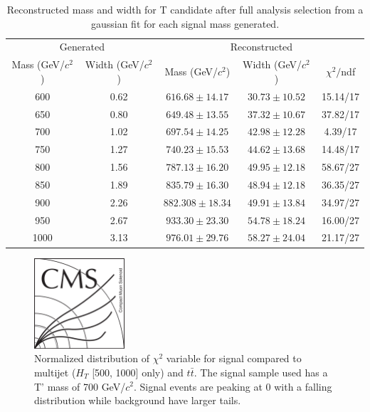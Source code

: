 \begin{table}[htbH]
\begin{center}
\begin{tabular}{|c|c|c|c|c|}
\hline 
\multicolumn{2}{|c}{Generated} & \multicolumn{3}{|c|}{Reconstructed} \\
Mass (GeV/$c^{2}$) & Width (GeV/$c^{2}$) & Mass (GeV/$c^{2}$) & Width (GeV/$c^{2}$) & $\chi^{2} /$ndf\\
\hline
600 & 0.62 &$616.68\pm14.17$ & $30.73\pm10.52$ & 15.14/17\\
650 & 0.80 &$649.48\pm13.55$ & $37.32\pm10.67$ & 37.82/17\\
700 & 1.02 &$697.54\pm14.25$ & $42.98\pm12.28$ & 4.39/17\\
750 & 1.27 &$740.23\pm15.53$ & $44.62\pm13.68$ & 14.48/17\\
800 & 1.56 &$787.13\pm16.20$ & $49.95\pm12.18$ & 58.67/27\\
850 & 1.89 &$835.79\pm16.30$ & $48.94\pm12.18$ & 36.35/27\\
900 & 2.26 &$882.308\pm18.34$ & $49.91\pm13.84$ & 34.97/27\\
950 & 2.67 &$933.30\pm23.30$ & $54.78\pm18.24$ & 16.00/27\\
1000 & 3.13 &$976.01\pm29.76$ & $58.27\pm24.04$ & 21.17/27\\
\hline
\end{tabular}
\caption{Reconstructed mass and width for T candidate after full analysis selection from a gaussian fit for each signal mass generated. \label{tab:SignalWidths}}
\end{center}
\end{table}

\begin{figure}[!Hhtbp]
  \begin{center}
    \includegraphics[width=0.3\textwidth]{figs/CMSlogo.png}
    \caption{Normalized distribution of $\chi^{2}$ variable for signal compared to multijet ($H_{T}$ [500, 1000] only) and $t\bar{t}$. The signal sample used has a T' mass of 700 GeV/$c^{2}$. Signal events are peaking at 0 with a falling distribution while background
    have larger tails.}
    \label{fig:chi2}
  \end{center}
\end{figure}\clearpage

